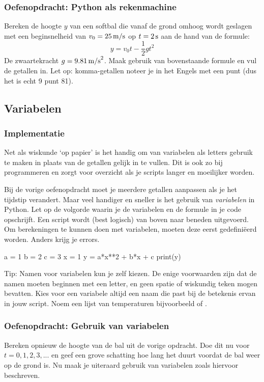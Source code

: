 \documentclass[a4paper,11pt, fleqn]{article}
\begin{document}
\subsubsection*{Oefenopdracht: Python als rekenmachine} Bereken de hoogte $y$ van een softbal die vanaf de grond omhoog wordt geslagen met een beginsnelheid van $v_0 = 25 \, {\rm m/s}$ op $t = 2 \, {\rm s}$ aan de hand van de formule:
\begin{equation}
y = v_0 t - \frac{1}{2}g t^2
\end{equation}
De zwaartekracht $g = 9.81 \, {\rm m/s}^2$. Maak gebruik van bovenstaande formule en vul de getallen in. Let op: komma-getallen noteer je in het Engels met een punt (dus het is echt 9 punt 81).

\subsection{Variabelen}

\subsubsection{Implementatie}
Net als wiskunde `op papier' is het handig om van variabelen als letters gebruik te maken in plaats van de getallen gelijk in te vullen. Dit is ook zo bij programmeren en zorgt voor overzicht als je scripts langer en moeilijker worden.

Bij de vorige oefenopdracht moet je meerdere getallen aanpassen als je het tijdstip verandert. Maar veel handiger en sneller is het gebruik van {\it variabelen} in Python. Let op de volgorde waarin je de variabelen en de formule in je code opschrijft. Een script wordt (best logisch) van boven naar beneden uitgevoerd. Om berekeningen te kunnen doen met variabelen, moeten deze eerst gedefini\"eerd worden. Anders krijg je errors.

\begin{python}
a = 1
b = 2
c = 3
x = 1
y = a*x**2 + b*x + c
print(y)
\end{python}

Tip: Namen voor variabelen kun je zelf kiezen. De enige voorwaarden zijn dat de namen moeten beginnen met een letter, en geen spatie of wiskundig teken mogen bevatten. Kies voor een variabele altijd een naam die past bij de betekenis ervan in jouw script. Noem een lijst van temperaturen bijvoorbeeld  of .

\subsubsection*{Oefenopdracht: Gebruik van variabelen} Bereken opnieuw de hoogte van de bal uit de vorige opdracht. Doe dit nu voor $t = 0,1,2,3, ... $ en geef een grove schatting hoe lang het duurt voordat de bal weer op de grond is. Nu maak je uiteraard gebruik van variabelen zoals hiervoor beschreven.
\end{document}
